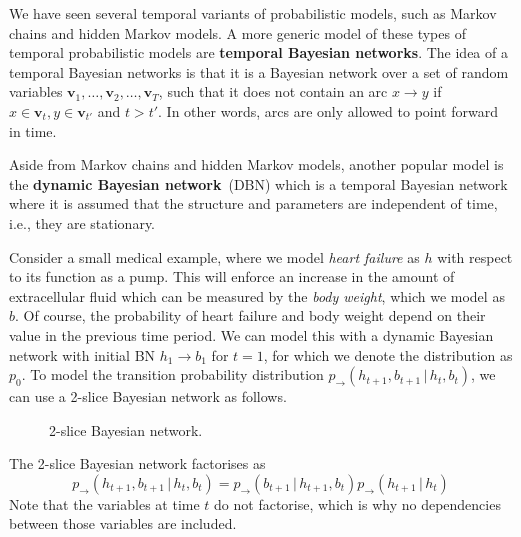 \documentclass{article}
\newcommand{\giv}{\,|\,}
\begin{document}
We have seen several temporal variants of probabilistic models, such as Markov chains and hidden Markov models. A more generic model of these types of temporal probabilistic models are \textbf{temporal Bayesian networks}. The idea of a temporal Bayesian networks is that it is a Bayesian network over a set of random variables $\mathbf{v}_1, \dots, \mathbf{v}_2, \dots, \mathbf{v}_T$, such that it does not contain an arc $x \rightarrow y$ if $x \in \mathbf{v}_t, y \in \mathbf{v}_{t'}$ and $t > t'$. In other words, arcs are only allowed to point forward in time. 

Aside from Markov chains and hidden Markov models, another popular model is the \textbf{dynamic Bayesian network}~(DBN) which is a temporal Bayesian network where it is assumed that the structure and parameters are independent of time, i.e., they are stationary. 

Consider a small medical example, where we model \textit{heart failure} as $h$ with respect to its function as a pump. This will enforce an increase in the amount of extracellular fluid which can be measured by the \textit{body weight}, which we model as $b$. Of course, the probability of heart failure and body weight depend on their value in the previous time period. We can model this with a dynamic Bayesian network with initial BN $h_1 \rightarrow b_1$ for $t=1$, for which we denote the distribution as $p_0$. To model the transition probability distribution $p_{\rightarrow}(h_{t+1}, b_{t+1} \giv h_t, b_t)$, we can use a 2-slice Bayesian network as follows.

\begin{figure}[H]
    \centering
    \caption{2-slice Bayesian network.}
    \label{fig:dbn}
\end{figure}

\noindent The 2-slice Bayesian network factorises as
$$
    p_{\rightarrow}(h_{t+1}, b_{t+1} \giv h_t, b_t) = p_{\rightarrow}(b_{t+1} \giv h_{t+1}, b_t)p_{\rightarrow}(h_{t+1} \giv h_t)
$$
\noindent Note that the variables at time $t$ do not factorise, which is why no dependencies between those variables are included. 
\end{document}
